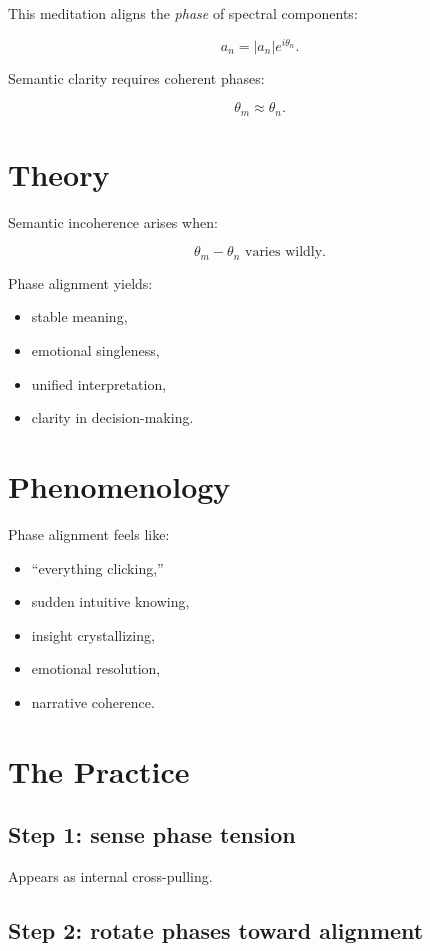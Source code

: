 \documentclass[12pt]{article}
\begin{document}
This meditation aligns the \emph{phase} of spectral components:

\[
a_n = |a_n| e^{i\theta_n}.
\]

Semantic clarity requires coherent phases:

\[
\theta_m \approx \theta_{n}.
\]

\section{Theory}

Semantic incoherence arises when:

\[
\theta_m - \theta_n \text{ varies wildly}.
\]

Phase alignment yields:

\begin{itemize}
    \item stable meaning,
    \item emotional singleness,
    \item unified interpretation,
    \item clarity in decision-making.
\end{itemize}

\section{Phenomenology}

Phase alignment feels like:

\begin{itemize}
    \item “everything clicking,”
    \item sudden intuitive knowing,
    \item insight crystallizing,
    \item emotional resolution,
    \item narrative coherence.
\end{itemize}

\section{The Practice}

\subsection*{Step 1: sense phase tension}

Appears as internal cross-pulling.

\subsection*{Step 2: rotate phases toward alignment}
\end{document}
